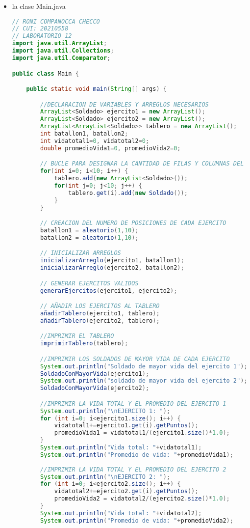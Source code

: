 \documentclass{article}
\begin{document}
\begin{itemize}
\begin{itemize}
        \item la clase Main.java
        
        \begin{lstlisting}[language=java]
// RONI COMPANOCCA CHECCO
// CUI: 20210558
// LABORATORIO 12
import java.util.ArrayList;
import java.util.Collections;
import java.util.Comparator;

public class Main {

    public static void main(String[] args) {

		//DECLARACION DE VARIABLES Y ARREGLOS NECESARIOS
		ArrayList<Soldado> ejercito1 = new ArrayList();
		ArrayList<Soldado> ejercito2 = new ArrayList();
		ArrayList<ArrayList<Soldado>> tablero = new ArrayList();
		int batallon1, batallon2;
		int vidatotal1=0, vidatotal2=0;
		double promedioVida1=0, promedioVida2=0;

		// BUCLE PARA DESIGNAR LA CANTIDAD DE FILAS Y COLUMNAS DEL TABLERO
		for(int i=0; i<10; i++) {
			tablero.add(new ArrayList<Soldado>());
			for(int j=0; j<10; j++) {
				tablero.get(i).add(new Soldado());
			}
		}

		// CREACION DEL NUMERO DE POSICIONES DE CADA EJERCITO
		batallon1 = aleatorio(1,10);
		batallon2 = aleatorio(1,10);

		// INICIALIZAR ARREGLOS
		inicializarArreglo(ejercito1, batallon1);
		inicializarArreglo(ejercito2, batallon2);

		// GENERAR EJERCITOS VALIDOS
		generarEjercitos(ejercito1, ejercito2);

		// AÑADIR LOS EJERCITOS AL TABLERO
		añadirTablero(ejercito1, tablero);
		añadirTablero(ejercito2, tablero);

		//IMPRIMIR EL TABLERO
		imprimirTablero(tablero);

		//IMPRIMIR LOS SOLDADOS DE MAYOR VIDA DE CADA EJERCITO
		System.out.println("Soldado de mayor vida del ejercito 1");
		SoldadoConMayorVida(ejercito1);
		System.out.println("soldado de mayor vida del ejercito 2");
		SoldadoConMayorVida(ejercito2);

		//IMPRIMIR LA VIDA TOTAL Y EL PROMEDIO DEL EJERCITO 1
		System.out.println("\nEJERCITO 1: ");
		for (int i=0; i<ejercito1.size(); i++) {
			vidatotal1+=ejercito1.get(i).getPuntos();
			promedioVida1 = vidatotal1/(ejercito1.size()*1.0);
		}
		System.out.println("Vida total: "+vidatotal1);
		System.out.println("Promedio de vida: "+promedioVida1);
		
		//IMPRIMIR LA VIDA TOTAL Y EL PROMEDIO DEL EJERCITO 2
		System.out.println("\nEJERCITO 2: ");
		for (int i=0; i<ejercito2.size(); i++) {
			vidatotal2+=ejercito2.get(i).getPuntos();
			promedioVida2 = vidatotal2/(ejercito2.size()*1.0);
		}
		System.out.println("Vida total: "+vidatotal2);
		System.out.println("Promedio de vida: "+promedioVida2);


\end{lstlisting}
\end{itemize}
\end{itemize}
\end{document}
